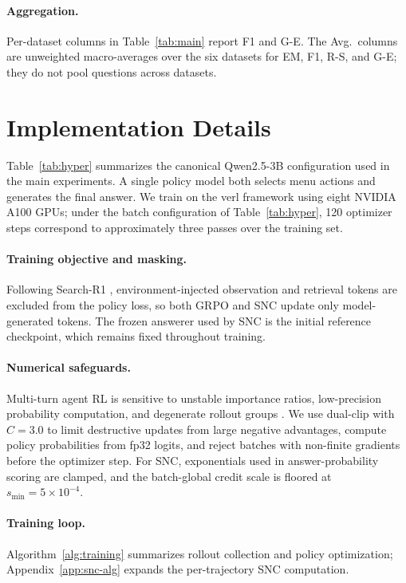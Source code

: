 \documentclass[letterpaper]{article} %
\begin{document}
\paragraph{Aggregation.}
Per-dataset columns in Table~\ref{tab:main} report F1 and G-E.
The Avg.\ columns are unweighted macro-averages over the six datasets for EM, F1, R-S, and G-E; they do not pool questions across datasets.

\section{Implementation Details}
\label{app:impl}

Table~\ref{tab:hyper} summarizes the canonical Qwen2.5-3B configuration used in the main experiments.
A single policy model both selects menu actions and generates the final answer.
We train on the verl framework \citep{sheng2024hybridflow} using eight NVIDIA A100 GPUs; under the batch configuration of Table~\ref{tab:hyper}, 120 optimizer steps correspond to approximately three passes over the training set.

\paragraph{Training objective and masking.}
Following Search-R1 \citep{jin2025searchr1}, environment-injected observation and retrieval tokens are excluded from the policy loss, so both GRPO and SNC update only model-generated tokens.
The frozen answerer used by SNC is the initial reference checkpoint, which remains fixed throughout training.

\paragraph{Numerical safeguards.}
Multi-turn agent RL is sensitive to unstable importance ratios, low-precision probability computation, and degenerate rollout groups \citep{wang2025ragen}.
We use dual-clip with $C{=}3.0$ to limit destructive updates from large negative advantages, compute policy probabilities from fp32 logits, and reject batches with non-finite gradients before the optimizer step.
For SNC, exponentials used in answer-probability scoring are clamped, and the batch-global credit scale is floored at $s_{\min}{=}5{\times}10^{-4}$.

\paragraph{Training loop.}
Algorithm~\ref{alg:training} summarizes rollout collection and policy optimization; Appendix~\ref{app:snc-alg} expands the per-trajectory SNC computation.
\end{document}
